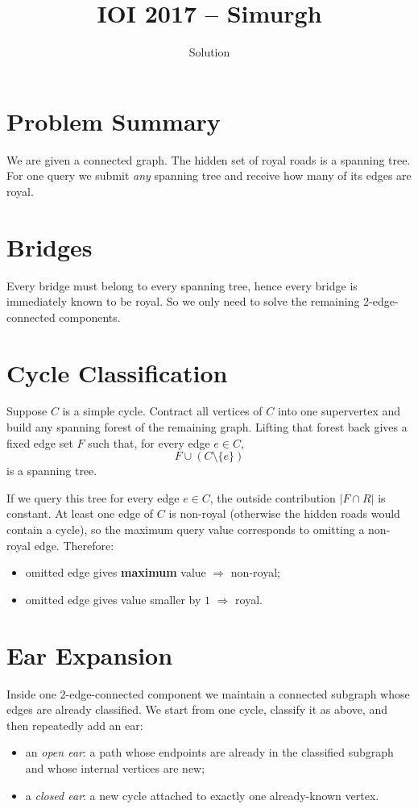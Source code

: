 \documentclass[11pt,a4paper]{article}
\title{IOI 2017 -- Simurgh}
\author{Solution}
\date{}
\begin{document}
\maketitle

\section{Problem Summary}
We are given a connected graph.
The hidden set of royal roads is a spanning tree.
For one query we submit \emph{any} spanning tree and receive how many of its edges are royal.

\section{Bridges}
Every bridge must belong to every spanning tree, hence every bridge is immediately known to be
royal.
So we only need to solve the remaining 2-edge-connected components.

\section{Cycle Classification}
Suppose $C$ is a simple cycle.
Contract all vertices of $C$ into one supervertex and build any spanning forest of the remaining
graph.
Lifting that forest back gives a fixed edge set $F$ such that, for every edge $e \in C$,
\[
F \cup (C \setminus \{e\})
\]
is a spanning tree.

If we query this tree for every edge $e \in C$, the outside contribution $|F \cap R|$ is constant.
At least one edge of $C$ is non-royal (otherwise the hidden roads would contain a cycle), so the
maximum query value corresponds to omitting a non-royal edge.
Therefore:
\begin{itemize}
  \item omitted edge gives \textbf{maximum} value $\Longrightarrow$ non-royal;
  \item omitted edge gives value smaller by $1$ $\Longrightarrow$ royal.
\end{itemize}

\section{Ear Expansion}
Inside one 2-edge-connected component we maintain a connected subgraph whose edges are already
classified.
We start from one cycle, classify it as above, and then repeatedly add an ear:
\begin{itemize}
  \item an \emph{open ear}: a path whose endpoints are already in the classified subgraph and
        whose internal vertices are new;
  \item a \emph{closed ear}: a new cycle attached to exactly one already-known vertex.
\end{itemize}
\end{document}
